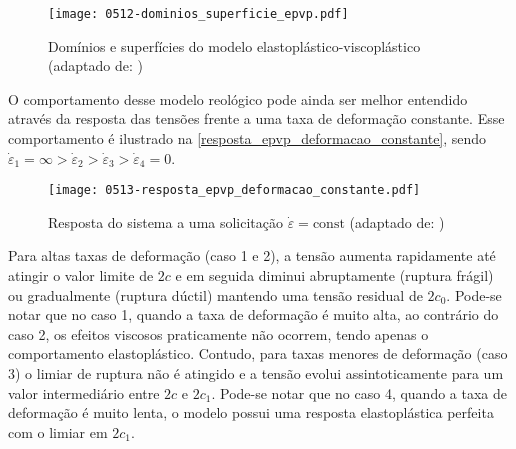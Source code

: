 \begin{figure}[H]
	\begin{center}
		\texttt{[image: 0512-dominios\_superficie\_epvp.pdf]}
	\end{center}
	\caption{\label{dominios_debernardi}Domínios e superfícies do modelo elastoplástico-viscoplástico (adaptado de: )}
\end{figure}
O comportamento desse modelo reológico pode ainda ser melhor entendido através da resposta das tensões frente a uma taxa de deformação constante. Esse comportamento é ilustrado na \autoref{resposta_epvp_deformacao_constante}, sendo $\dot \varepsilon_1 = \infty > \dot \varepsilon_2 > \dot \varepsilon_3 > \dot \varepsilon_4 = 0$.
\begin{figure}[H]
	\begin{center}
		\texttt{[image: 0513-resposta\_epvp\_deformacao\_constante.pdf]}
	\end{center}
	\caption{\label{resposta_epvp_deformacao_constante}Resposta do sistema a uma solicitação $\dot \varepsilon = \text{const}$ (adaptado de: )}
\end{figure}
Para altas taxas de deformação (caso 1 e 2), a tensão aumenta rapidamente até atingir o valor limite de $2c$ e em seguida diminui abruptamente (ruptura frágil) ou gradualmente (ruptura dúctil) mantendo uma tensão residual de $2c_0$. Pode-se notar que no caso 1, quando a taxa de deformação é muito alta, ao contrário do caso 2, os efeitos viscosos praticamente não ocorrem, tendo apenas o comportamento elastoplástico. Contudo, para taxas menores de deformação (caso 3) o limiar de ruptura não é atingido e a tensão evolui assintoticamente para um valor intermediário entre $2c$ e $2c_1$. Pode-se notar que no caso 4, quando a taxa de deformação é muito lenta, o modelo possui uma resposta elastoplástica perfeita com o limiar em $2c_1$.
